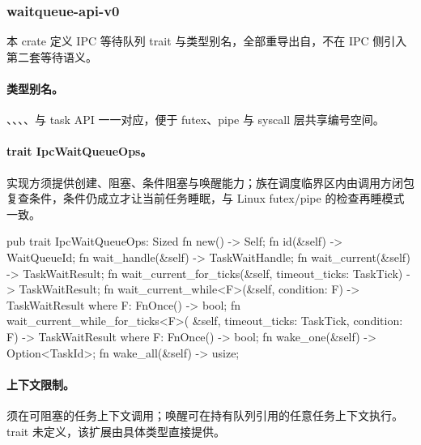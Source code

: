 
\subsubsection{waitqueue-api-v0}

本 crate 定义 IPC 等待队列 trait 与类型别名，全部重导出自，不在 IPC 侧引入第二套等待语义。

\paragraph{类型别名。}
、、、、与 task API 一一对应，便于 futex、pipe 与 syscall 层共享编号空间。

\paragraph{trait IpcWaitQueueOps。}
实现方须提供创建、阻塞、条件阻塞与唤醒能力；族在调度临界区内由调用方闭包复查条件，条件仍成立才让当前任务睡眠，与 Linux futex/pipe 的检查再睡模式一致。

\begin{rustcode}
pub trait IpcWaitQueueOps: Sized {
    fn new() -> Self;
    fn id(&self) -> WaitQueueId;
    fn wait_handle(&self) -> TaskWaitHandle;
    fn wait_current(&self) -> TaskWaitResult;
    fn wait_current_for_ticks(&self, timeout_ticks: TaskTick) -> TaskWaitResult;
    fn wait_current_while<F>(&self, condition: F) -> TaskWaitResult
        where F: FnOnce() -> bool;
    fn wait_current_while_for_ticks<F>(
        &self, timeout_ticks: TaskTick, condition: F) -> TaskWaitResult
        where F: FnOnce() -> bool;
    fn wake_one(&self) -> Option<TaskId>;
    fn wake_all(&self) -> usize;
}
\end{rustcode}

\paragraph{上下文限制。}
须在可阻塞的任务上下文调用；唤醒可在持有队列引用的任意任务上下文执行。trait 未定义，该扩展由具体类型直接提供。
